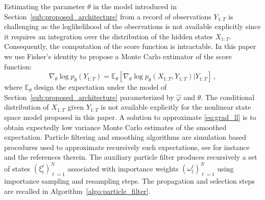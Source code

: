 \documentclass{article}
\begin{document}
Estimating the parameter $\theta$ in the model introduced in Section~\ref{sub:proposed_architecture} from a record of observations $Y_{1:T}$ is challenging as the loglikelihood of the observations is not available explicitly since  it requires an integration over the distribution of the hidden states $X_{1:T}$. Consequently, the computation of the score function is intractable.
In this paper we use Fisher's identity to propose a Monte Carlo extimator of the score function:
\begin{equation}
	\nabla_\theta \log p_\theta(Y_{1:T}) = \mathbb{E}_\theta \left[ \nabla_\theta\log p_\theta(X_{1:T}, Y_{1:T}) | Y_{1:T} \right]\,,
	\label{eq:grad_ll}
\end{equation}
where $\mathbb{E}_\theta$ design the expectation under the model of Section~\ref{sub:proposed_architecture} parameterized by $\widehat \varphi$ and $\theta$. The conditional distribution of $X_{1:T}$ given $Y_{1:T}$ is not available explicitly for the nonlinear state space model proposed in this paper. A solution to approximate \eqref{eq:grad_ll} is to obtain expectedly low variance Monte Carlo estimates of the smoothed expectation. 
Particle filtering and smoothing algorithms are simulation based procedures used to approximate recursively such expectations, see for instance \cite{} and the references therein. 
 The auxiliary particle filter produces recursively a set of states $(\xi^{\ell}_t)_{\ell=1}^N$ associated with importance weights $(\omega^{\ell}_t)_{\ell=1}^N$ using importance sampling and resampling steps. %
The propagation and selection steps are recalled in Algorithm~\ref{algo:particle_filter}.
\end{document}
